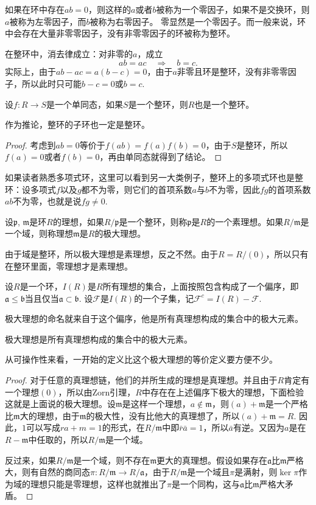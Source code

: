 \para[零因子与整环] 如果在环中存在$ab=0$，则这样的$a$或者$b$被称为一个零因子，如果不是交换环，则$a$被称为左零因子，而$b$被称为右零因子。
零显然是一个零因子。而一般来说，环中会存在大量非零零因子，没有非零零因子的环被称为整环。\endpara

在整环中，消去律成立：对非零的$a$，成立
\[
	ab=ac \quad \Rightarrow \quad b=c.
\]
实际上，由于$ab-ac=a(b-c)=0$，由于$a$非零且环是整环，没有非零零因子，所以此时只可能$b-c=0$或$b=c$.

\begin{lem}
	设$f:R\to S$是一个单同态，如果$S$是一个整环，则$R$也是一个整环。
\end{lem}

作为推论，整环的子环也一定是整环。

\begin{proof}
	考虑到$ab=0$等价于$f(ab)=f(a)f(b)=0$，由于$S$是整环，所以$f(a)=0$或者$f(b)=0$，再由单同态就得到了结论。
\end{proof}

如果读者熟悉多项式环，这里可以看到另一大类例子，整环上的多项式环也是整环：设多项式$f$以及$g$都不为零，则它们的首项系数$a$与$b$不为零，因此$fg$的首项系数$ab$不为零，也就是说$fg\neq 0$.

\para[素理想与极大理想] 设$\mathfrak{p}$, $\mathfrak{m}$是环$R$的理想，如果$R/\mathfrak{p}$是一个整环，则称$\mathfrak{p}$是$R$的一个素理想。如果$R/\mathfrak{m}$是一个域，则称理想$\mathfrak{m}$是$R$的极大理想。\endpara

由于域是整环，所以极大理想是素理想，反之不然。由于$R=R/(0)$，所以只有在整环里面，零理想才是素理想。

\para[理想集的偏序] 设$R$是一个环，$I(R)$是$R$所有理想的集合，上面按照包含构成了一个偏序，即$\mathfrak{a}\leq \mathfrak{b}$当且仅当$\mathfrak{a}\subset \mathfrak{b}$. 设$\mathcal{F}$是$I(R)$的一个子集，记$\mathcal{F}^c=I(R)-\mathcal{F}$.\endpara

极大理想的命名就来自于这个偏序，他是所有真理想构成的集合中的极大元素。

\begin{pro}
	极大理想是所有真理想构成的集合中的极大元素。
\end{pro}

从可操作性来看，一开始的定义比这个极大理想的等价定义要方便不少。

\begin{proof}
	对于任意的真理想链，他们的并所生成的理想是真理想。并且由于$R$肯定有一个理想$(0)$，所以由Zorn引理，$R$中存在在上述偏序下极大的理想，下面检验这就是上面说的极大理想。设$\mathfrak{m}$是这样一个理想，$a\notin \mathfrak{m}$，则$(a)+\mathfrak{m}$是一个严格比$\mathfrak{m}$大的理想，由于$\mathfrak{m}$的极大性，没有比他大的真理想了，所以$(a)+\mathfrak{m}=R$. 因此，$1$可以写成$ra+m=1$的形式，在$R/\mathfrak{m}$中即$\bar{r}\bar{a}=1$，所以$\bar{a}$有逆。又因为$a$是在$R-\mathfrak{m}$中任取的，所以$R/\mathfrak{m}$是一个域。

	反过来，如果$R/\mathfrak{m}$是一个域，则不存在$\mathfrak{m}$更大的真理想。假设如果存在$\mathfrak{a}$比$\mathfrak{m}$严格大，则有自然的商同态$\pi:R/\mathfrak{m}\to R/\mathfrak{a}$，由于$R/\mathfrak{m}$是一个域且$\pi$是满射，则$\ker \pi$作为域的理想只能是零理想，这样也就推出了$\pi$是一个同构，这与$\mathfrak{a}$比$\mathfrak{m}$严格大矛盾。
\end{proof}


